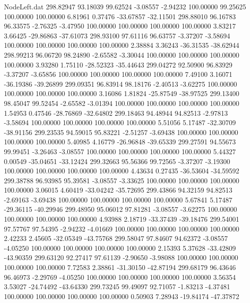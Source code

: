 \begin{filecontents}{NodeLeft.dat}
 298.82947   93.18039   99.62524    -3.08557   -2.94232  100.00000   99.25625  100.00000  100.00000    6.81961    0.37476  -33.67857  -32.11501
 298.88010   96.16783   96.33575    -2.76325   -3.47950  100.00000  100.00000  100.00000  100.00000    3.83217    3.66425  -29.86863  -37.61073
 298.93100   97.61116   96.63757    -3.37207   -3.58694  100.00000  100.00000  100.00000  100.00000    2.38884    3.36243  -36.31535  -38.62944
 298.99213   96.06720   98.24890    -2.65582   -3.30044  100.00000  100.00000  100.00000  100.00000    3.93280    1.75110  -28.52323  -35.44643
 299.04272   92.50900   96.83929    -3.37207   -3.65856  100.00000  100.00000  100.00000  100.00000    7.49100    3.16071  -36.19386  -39.26899
 299.09351   96.83914   98.18176    -2.40513   -3.62275  100.00000  100.00000  100.00000  100.00000    3.16086    1.81824  -25.87549  -38.97525
 299.13400   98.45047   99.52454    -2.65582   -3.01394  100.00000  100.00000  100.00000  100.00000    1.54953    0.47546  -28.76869  -32.64802
 299.18463   94.48944   94.82513    -2.97813   -3.58694  100.00000  100.00000  100.00000  100.00000    5.51056    5.17487  -32.30709  -38.91156
 299.23535   94.59015   95.83221    -2.51257   -3.69438  100.00000  100.00000  100.00000  100.00000    5.40985    4.16779  -26.96848  -39.65339
 299.27591   94.55673   99.99451    -3.26463   -3.08557  100.00000  100.00000  100.00000  100.00000    5.44327    0.00549  -35.04651  -33.12424
 299.32663   95.56366   99.72565    -3.37207   -3.19300  100.00000  100.00000  100.00000  100.00000    4.43634    0.27435  -36.53604  -34.59592
 299.38788   96.93985   95.39581    -3.08557   -3.33625  100.00000  100.00000  100.00000  100.00000    3.06015    4.60419  -33.04242  -35.72695
 299.43866   94.32159   94.82513    -2.69163   -3.69438  100.00000  100.00000  100.00000  100.00000    5.67841    5.17487  -29.36115  -40.29946
 299.48950   95.06012   97.81281    -3.08557   -3.62275  100.00000  100.00000  100.00000  100.00000    4.93988    2.18719  -33.37439  -39.18476
 299.54001   97.57767   97.54395    -2.94232   -4.01669  100.00000  100.00000  100.00000  100.00000    2.42233    2.45605  -32.05349  -43.75768
 299.58047   97.84607   94.62372    -3.08557   -4.05250  100.00000  100.00000  100.00000  100.00000    2.15393    5.37628  -33.42809  -43.90359
 299.63120   92.27417   97.61139    -2.90650   -3.98088  100.00000  100.00000  100.00000  100.00000    7.72583    2.38861  -31.30150  -42.87194
 299.68179   96.43646   96.46973    -2.29769   -4.05250  100.00000  100.00000  100.00000  100.00000    3.56354    3.53027  -24.74492  -43.64330
 299.73245   99.49097   92.71057    -1.83213   -4.37481  100.00000  100.00000  100.00000  100.00000    0.50903    7.28943  -19.84174  -47.37872

\end{filecontents}
